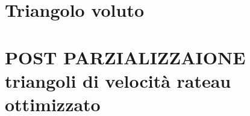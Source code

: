 \documentclass[a4paper, 15pt]{article}
\begin{document}
\section{Triangolo voluto }



\section{POST PARZIALIZZAIONE triangoli di velocità rateau ottimizzato}
\end{document}

